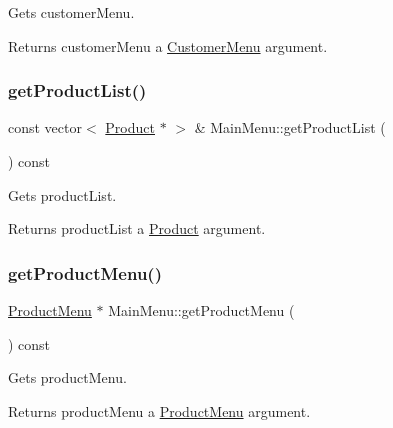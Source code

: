 Gets customer\+Menu. 

\begin{DoxyReturn}{Returns}
customer\+Menu a \hyperlink{classCustomerMenu}{Customer\+Menu} argument. 
\end{DoxyReturn}
\mbox{\label{classMainMenu_ae122d42a6ffd8735c4abcd789473a4e9}} 
\subsubsection{\texorpdfstring{get\+Product\+List()}{getProductList()}}
{\footnotesize\ttfamily const vector$<$ \hyperlink{classProduct}{Product} $\ast$ $>$ \& Main\+Menu\+::get\+Product\+List (\begin{DoxyParamCaption}{ }\end{DoxyParamCaption}) const}



Gets product\+List. 

\begin{DoxyReturn}{Returns}
product\+List a \hyperlink{classProduct}{Product} argument. 
\end{DoxyReturn}
\mbox{\label{classMainMenu_a96cf34491424fb414023b2ae6f64540b}} 
\subsubsection{\texorpdfstring{get\+Product\+Menu()}{getProductMenu()}}
{\footnotesize\ttfamily \hyperlink{classProductMenu}{Product\+Menu} $\ast$ Main\+Menu\+::get\+Product\+Menu (\begin{DoxyParamCaption}{ }\end{DoxyParamCaption}) const}



Gets product\+Menu. 

\begin{DoxyReturn}{Returns}
product\+Menu a \hyperlink{classProductMenu}{Product\+Menu} argument. 
\end{DoxyReturn}
\mbox{\label{classMainMenu_a59f7c25cfd99dc969de1b29acda75a9c}} 
